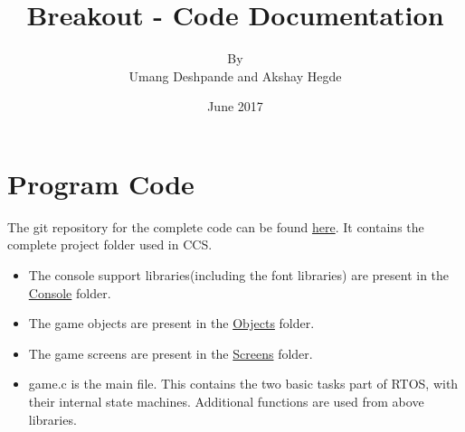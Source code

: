\documentclass{article}
\title{Breakout - Code Documentation}
\author{By \\ Umang Deshpande and Akshay Hegde}
\date{June 2017}
\begin{document}
\maketitle

\section{Program Code}
\qquad The git repository for the complete code can be found \href{https://github.com/eYSIP-2017/eYSIP-2017_Game_Development-TI-RTOS/tree/master/Breakout_Final}{here}. It contains the complete project folder used in CCS. 
\begin{itemize}
  \item The console support libraries(including the font libraries) are present in the \href{https://github.com/eYSIP-2017/eYSIP-2017_Game_Development-TI-RTOS/tree/master/Breakout_Final/Console}{Console} folder. 
  \item The game objects are present in the \href{https://github.com/eYSIP-2017/eYSIP-2017_Game_Development-TI-RTOS/tree/master/Breakout_Final/Objects}{Objects} folder.
    \item The game screens are present in the \href{https://github.com/eYSIP-2017/eYSIP-2017_Game_Development-TI-RTOS/tree/master/Breakout_Final/Screens}{Screens} folder.
  \item game.c is the main file. This contains the two basic tasks part of RTOS, with their internal state machines. Additional functions are used from above libraries.
\end{itemize}
\end{document}
